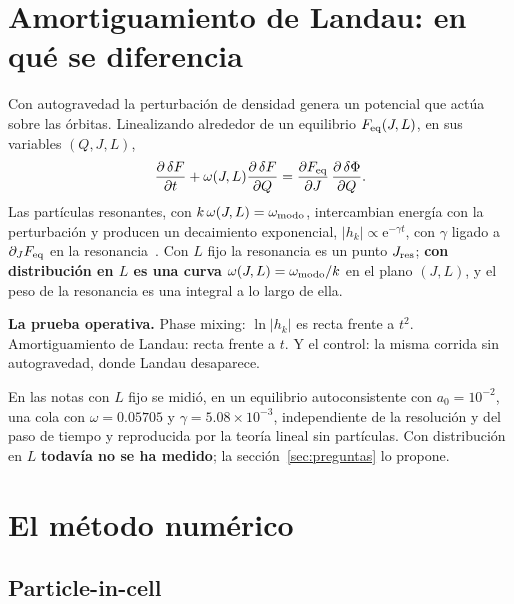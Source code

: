 \documentclass[11pt,a4paper]{article}
\newcommand{\ee}{\mathrm{e}}
\begin{document}
\section{Amortiguamiento de Landau: en qué se diferencia}
\label{sec:landau}

Con autogravedad la perturbación de densidad genera un potencial que actúa sobre las
órbitas. Linealizando alrededor de un equilibrio $F_{\rm eq}(J,L)$, en sus variables
$(Q,J,L)$,
\begin{equation}
  \frac{\partial\,\delta F}{\partial t}+\omega(J,L)\frac{\partial\,\delta F}{\partial Q}
  =\frac{\partial F_{\rm eq}}{\partial J}\,\frac{\partial\,\delta\Phi}{\partial Q}.
  \label{eq:lineal}
\end{equation}
Las partículas resonantes, con $k\,\omega(J,L)=\omega_{\rm modo}$, intercambian energía
con la perturbación y producen un decaimiento exponencial,
$|h_k|\propto\ee^{-\gamma t}$, con $\gamma$ ligado a $\partial_JF_{\rm eq}$ en la
resonancia~\cite{landau1946,binney2008}. Con $L$ fijo la resonancia es un punto $J_{\rm
res}$; \textbf{con distribución en $L$ es una curva} $\omega(J,L)=\omega_{\rm modo}/k$ en
el plano $(J,L)$, y el peso de la resonancia es una integral a lo largo de ella.

\begin{idea}
\textbf{La prueba operativa.} Phase mixing: $\ln|h_k|$ es recta frente a $t^2$.
Amortiguamiento de Landau: recta frente a $t$. Y el control: la misma corrida sin
autogravedad, donde Landau desaparece.
\end{idea}

En las notas con $L$ fijo se midió, en un equilibrio autoconsistente con $a_0=10^{-2}$,
una cola con $\omega=0.05705$ y $\gamma=5.08\times10^{-3}$, independiente de la resolución
y del paso de tiempo y reproducida por la teoría lineal sin partículas. Con distribución
en $L$ \textbf{todavía no se ha medido}; la sección~\ref{sec:preguntas} lo propone.

\section{El método numérico}
\label{sec:metodo}

\subsection{Particle-in-cell}
\end{document}

